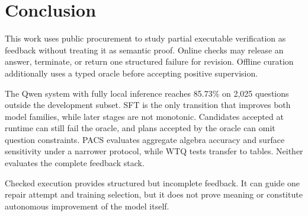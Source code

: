 \section{Conclusion}
\label{sec:conclusion}

This work uses public procurement to study partial executable verification as feedback without
treating it as semantic proof.  Online checks may release an answer, terminate, or return one
structured failure for revision.  Offline curation additionally uses a typed oracle before
accepting positive supervision.

The Qwen system with fully local inference reaches 85.73\% on 2,025 questions outside the
development subset.  SFT is the only transition that improves both model families, while later
stages are not monotonic.  Candidates accepted at runtime can still fail the oracle, and plans
accepted by the oracle can omit question constraints.  PACS evaluates aggregate algebra accuracy
and surface sensitivity under a narrower protocol, while WTQ tests transfer to tables.  Neither
evaluates the complete feedback stack.

Checked execution provides structured but incomplete feedback.  It can guide one repair attempt
and training selection, but it does not prove meaning or constitute autonomous improvement of the
model itself.
